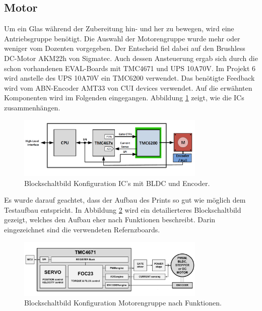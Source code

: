 \clearpage
\subsection{Motor}
\label{subsec:Motor}

Um ein Glas während der Zubereitung hin- und her zu bewegen, wird eine Antriebsgruppe benötigt. Die Auswahl der Motorengruppe wurde mehr oder weniger vom Dozenten vorgegeben. Der Entscheid fiel dabei auf den Brushless DC-Motor AKM22h von Sigmatec. Auch dessen Ansteuerung ergab sich durch die schon vorhandenen EVAL-Boards mit TMC4671 und UPS 10A70V. Im Projekt 6 wird anstelle des UPS 10A70V ein TMC6200 verwendet. Das benötigte Feedback wird vom ABN-Encoder AMT33 von CUI devices verwendet. Auf die erwähnten Komponenten wird im Folgenden eingegangen. Abbildung \ref{fig:Blockdiagramm_TMC4671_und_TMC6200} zeigt, wie die ICs zusammenhängen. 

\begin{figure}[H]
	\centering
	\includegraphics[width=0.8\textwidth]{graphics/Blockdiagramm_TMC4671_und_TMC6200}
	\caption{Blockschaltbild Konfiguration IC's mit BLDC und Encoder. \cite[S.1]{trinamicmotion_control_gmbh__co_kg_tmc6200_2019}}
	\label{fig:Blockdiagramm_TMC4671_und_TMC6200}
\end{figure}

Es wurde darauf geachtet, dass der Aufbau des Prints so gut wie möglich dem Testaufbau entspricht. In Abbildung \ref{fig:Blockdiagramm_Motorengruppe} wird ein detailierteres Blockschaltbild gezeigt, welches den Aufbau eher nach Funktionen beschreibt. Darin eingezeichnet sind die verwendeten Refernzboards.

\begin{figure}[H]
	\centering
	\includegraphics[width=0.8\textwidth]{graphics/Blockdiagramm_Motorengruppe}
	\caption{Blockschaltbild Konfiguration Motorengruppe nach Funktionen. \cite[S.1]{trinamicmotion_control_gmbh__co_kg_tmc4671_2019}}
	\label{fig:Blockdiagramm_Motorengruppe}
\end{figure}

